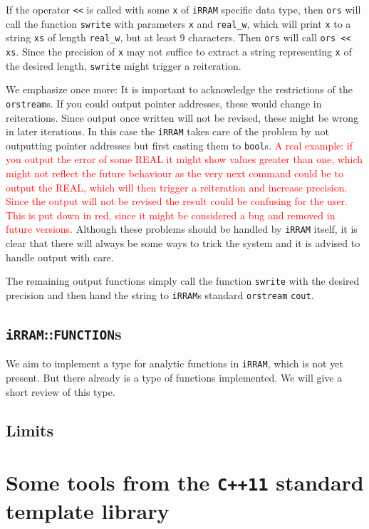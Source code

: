 \documentclass{article}
\newcommand{\irram}{\texttt{iRRAM}\xspace}
\newcommand{\irrams}{\texttt{iRRAM}s\xspace}
\newcommand{\ccOx}{\texttt{C++11}\xspace}
\newcommand{\ir}[1]{\texttt{#1}}
\newcommand{\code}[1]{\texttt{#1}}
\newcommand{\temp}[1]{\textcolor{red}{#1}}
\begin{document}
If the operator \code{<<} is called with some \code{x} of \irram specific data type, then \code{ors} will call the function \ir{swrite} with parameters \code{x} and \ir{real\_w}, which will print \code{x} to a string \code{xs} of length \ir{real\_w}, but at least $9$ characters. Then \code{ors} will call \code{ors << xs}. Since the precision of \code{x} may not suffice to extract a string representing \code{x} of the desired length, \ir{swrite} might trigger a reiteration.

We emphasize once more: It is important to acknowledge the restrictions of the \ir{orstream}s. If you could output pointer addresses, these would change in reiterations. Since output once written will not be revised, these might be wrong in later iterations. In this case the \irram takes care of the problem by not outputting pointer addresses but first casting them to \code{bool}s. \temp{A real example: if you output the error of some REAL it might show values greater than one, which might not reflect the future behaviour as the very next command could be to output the REAL, which will then trigger a reiteration and increase precision. Since the output will not be revised the result could be confusing for the user. This is put down in red, since it might be considered a bug and removed in future versions.} Although these problems should be handled by \irram itself, it is clear that there will always be some ways to trick the system and it is advised to handle output with care.

The remaining output functions simply call the function \ir{swrite} with the desired precision and then hand the string to \irrams standard \ir{orstream} \ir{cout}.

\subsection{\irram::\ir{FUNCTION}s}

We aim to implement a type for analytic functions in \irram, which is not yet present. But there already is a type of functions implemented. We will give a short review of this type.

\subsection{Limits}

\section{Some tools from the \ccOx standard template library}
\end{document}
